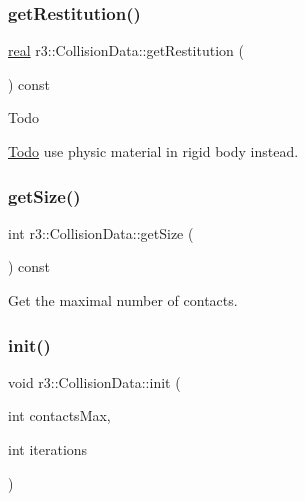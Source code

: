 \subsubsection{\texorpdfstring{get\+Restitution()}{getRestitution()}}
{\footnotesize\ttfamily \mbox{\hyperlink{namespacer3_ab2016b3e3f743fb735afce242f0dc1eb}{real}} r3\+::\+Collision\+Data\+::get\+Restitution (\begin{DoxyParamCaption}{ }\end{DoxyParamCaption}) const\hspace{0.3cm}{\ttfamily [inline]}}

\begin{DoxyRefDesc}{Todo}
\item[\mbox{\hyperlink{todo__todo000010}{Todo}}]use physic material in rigid body instead. \end{DoxyRefDesc}
\mbox{\label{classr3_1_1_collision_data_ad0898e21e34b4558dbdd68dd115c49d8}} 
\subsubsection{\texorpdfstring{get\+Size()}{getSize()}}
{\footnotesize\ttfamily int r3\+::\+Collision\+Data\+::get\+Size (\begin{DoxyParamCaption}{ }\end{DoxyParamCaption}) const}

Get the maximal number of contacts. \mbox{\label{classr3_1_1_collision_data_a2af69fd6da492254b1a134d4ef82efce}} 
\subsubsection{\texorpdfstring{init()}{init()}}
{\footnotesize\ttfamily void r3\+::\+Collision\+Data\+::init (\begin{DoxyParamCaption}\item[{int}]{contacts\+Max,  }\item[{int}]{iterations }\end{DoxyParamCaption})}

\mbox{\label{classr3_1_1_collision_data_a3b97a4828252625e891c939ad7ce0064}} 
